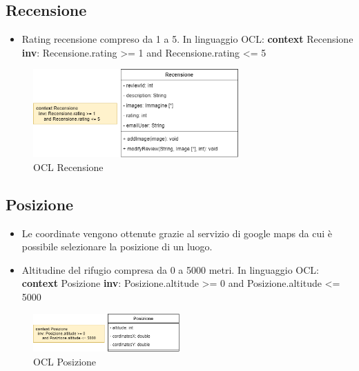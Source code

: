 \documentclass[a4paper,12pt]{article}
\begin{document}
\subsection{Recensione}
\begin{itemize}
    \item Rating recensione compreso da 1 a 5. \newline \newline In linguaggio OCL:\newline
    \textbf{context} Recensione \textbf{inv}: Recensione.rating >= 1 and Recensione.rating <= 5
\end{itemize}

\begin{figure}[H]
   \centering
   \includegraphics[width=0.7\textwidth] {D3/img/recensione_OCL.png}
    \caption{OCL Recensione}
\end{figure}



\subsection{Posizione}
\begin{itemize}
    \item Le coordinate vengono ottenute grazie al servizio di google maps da cui è possibile selezionare la posizione di un luogo.
    \item Altitudine del rifugio compresa da 0 a 5000 metri. \newline \newline In linguaggio OCL:\newline
    \textbf{context} Posizione \textbf{inv}: Posizione.altitude >= 0 and Posizione.altitude <= 5000
\end{itemize}

\begin{figure}[H]
   \centering
   \includegraphics[width=0.5\textwidth] {D3/img/posizione_OCL.png}
    \caption{OCL Posizione}
\end{figure}
\end{document}
